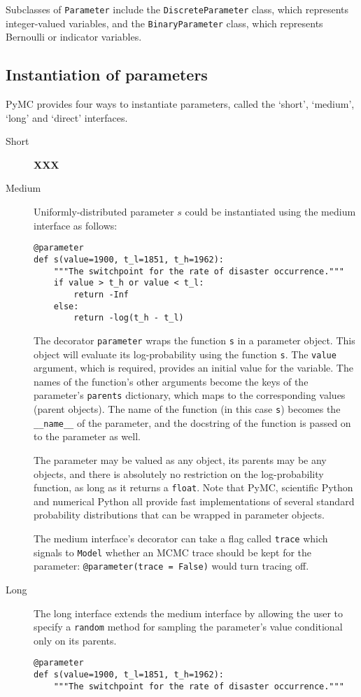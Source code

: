 Subclasses of \texttt{Parameter} include the \texttt{DiscreteParameter} class, which represents integer-valued variables, and the \texttt{BinaryParameter} class, which represents Bernoulli or indicator variables. 

\subsection{Instantiation of parameters}
PyMC provides four ways to instantiate parameters, called the `short', `medium', `long' and `direct' interfaces.
\begin{description}
    \item[Short] \textbf{XXX}
    \item[Medium] Uniformly-distributed parameter $s$ could be instantiated using the medium interface as follows:
    \begin{verbatim}
@parameter
def s(value=1900, t_l=1851, t_h=1962):
    """The switchpoint for the rate of disaster occurrence."""
    if value > t_h or value < t_l:
        return -Inf
    else:
        return -log(t_h - t_l) 
    \end{verbatim}
    The decorator \texttt{parameter} wraps the function \texttt{s} in a parameter object. This object will evaluate its log-probability using the function \texttt{s}. The \texttt{value} argument, which is required, provides an initial value for the variable. The names of the function's other arguments become the keys of the parameter's \texttt{parents} dictionary, which maps to the corresponding values (parent objects). The name of the function (in this case \texttt{s}) becomes the \texttt{\_\_name\_\_} of the parameter, and the docstring of the function is passed on to the parameter as well.

The parameter may be valued as any object, its parents may be any objects, and there is absolutely no restriction on the log-probability function, as long as it returns a \texttt{float}. Note that PyMC, scientific Python and numerical Python all provide fast implementations of several standard probability distributions that can be wrapped in parameter objects.

    The medium interface's decorator can take a flag called \texttt{trace} which signals to \texttt{Model} whether an MCMC trace should be kept for the parameter: \texttt{@parameter(trace = False)} would turn tracing off.

    \item[Long] The long interface extends the medium interface by allowing the user to specify a \texttt{random} method for sampling the parameter's value conditional only on its parents.
    \begin{verbatim}
@parameter
def s(value=1900, t_l=1851, t_h=1962):
    """The switchpoint for the rate of disaster occurrence."""


\end{verbatim}
\end{description}

